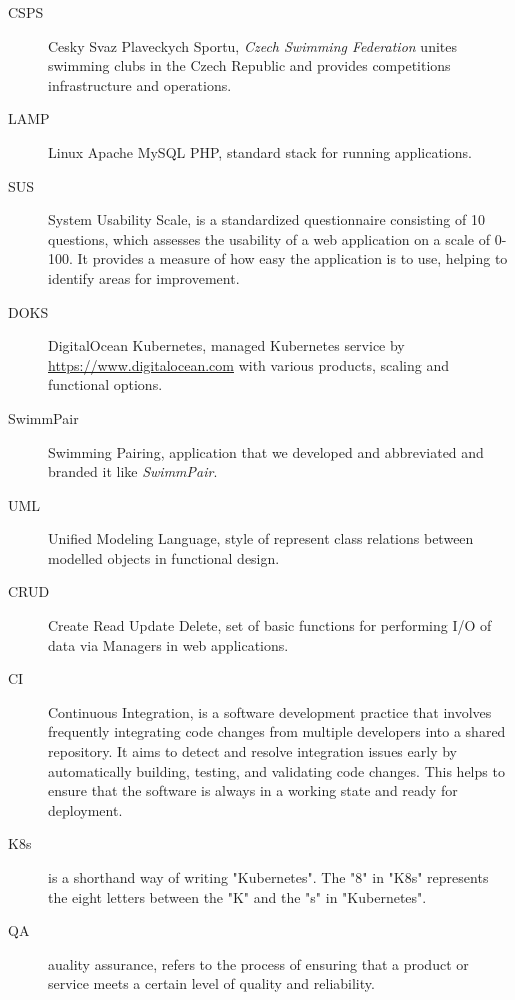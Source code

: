 \documentclass[12pt,a4paper]{report}
\begin{document}
\begin{description}
  
  \item[CSPS] Cesky Svaz Plaveckych Sportu, \textit{Czech Swimming Federation} unites swimming clubs in the Czech Republic and provides competitions infrastructure and operations.
  
	\item[LAMP] Linux Apache MySQL PHP, standard stack for running applications.
	
	\item[SUS] System Usability Scale, is a standardized questionnaire consisting of 10 questions, which assesses the usability of a web application on a scale of 0-100. It provides a measure of how easy the application is to use, helping to identify areas for improvement.
	
  \item[DOKS] DigitalOcean Kubernetes, managed Kubernetes service by \url{https://www.digitalocean.com} with various products, scaling and functional options.
  
  \item[SwimmPair] Swimming Pairing, application that we developed and abbreviated and branded it like \textit{SwimmPair}.
  
  \item[UML] Unified Modeling Language, style of represent class relations between modelled objects in functional design. 
  
  \item[CRUD] Create Read Update Delete, set of basic functions for performing I/O of data via Managers in web applications.
  
  \item[CI] Continuous Integration, is a software development practice that involves frequently integrating code changes from multiple developers into a shared repository. It aims to detect and resolve integration issues early by automatically building, testing, and validating code changes. This helps to ensure that the software is always in a working state and ready for deployment.  
  
  \item[K8s] is a shorthand way of writing "Kubernetes". The "8" in "K8s" represents the eight letters between the "K" and the "s" in "Kubernetes".
  
  \item[QA] auality assurance, refers to the process of ensuring that a product or service meets a certain level of quality and reliability.
	

\end{description}
\end{document}

